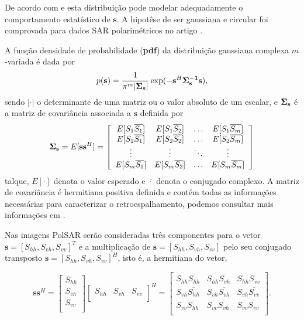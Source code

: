 De acordo com \citet{good} e \citet{lee} esta distribuição pode modelar adequadamente o comportamento estatístico de $\mathbf{s}$. A hipotêse de ser gaussiana e circular foi comprovada para dados SAR polarimétricos no artigo \citet{sarabendi}.   

A função densidade de probabilidade ({\bf pdf}) da distribuição gaussiana complexa $m$-variada é dada por
\begin{equation}\label{cap_acf_4}
    p({\bf s})=\frac{1}{\pi^m|\bf{\Sigma}_{{\bf s}}|}\exp(-{\bf s}^{H}\bf{\Sigma}_{{\bf s}}^{-1}{\bf s}), 
\end{equation}
sendo $|\cdot|$ o determinante de uma matriz ou o valor absoluto de um escalar, e $\mathbf{\Sigma}_{\bf{s}}$ é a matriz de covariância associada a $\mathbf{s}$ definida por
\begin{equation}\label{cap_acf_5}
	{\bf \Sigma_{{\bf s}}} = E[{\mathbf s}{\mathbf s}^H] = \left[
\begin{array}{cccc}
	E[S_1\overline{S_1}]  & E[{S_1}\overline{S_2}] &\hdots & E[S_1\overline{S_m}] \\
	E[S_2\overline{S_1}]  & E[{S_2}\overline{S_2}] &\hdots &E[S_2\overline{S_m}]\\
        \vdots&\vdots &\ddots &\vdots\\
	E[S_m\overline{S_1}]  & E[S_m\overline{S_2}] &\hdots &E[S_m\overline{S_m}]\\
\end{array}
\right]
\end{equation}
talque, $E[\cdot]$ denota o valor esperado e $\overline{\cdot}$ denota o conjugado complexo. A matriz de covariância é hermitiana positiva definida e contém todas as informações necessárias para caracterizar o retroespalhamento, podemos consultar mais informações em \citep{mfp}. 

Nas imagens PolSAR serão consideradas três componentes para o vetor $\mathbf{s}=[S_{hh},S_{vh},S_{vv}]^T$ e a multiplicação de $\mathbf{s}=[S_{hh},S_{vh},S_{vv}]$ pelo seu conjugado transposto $\mathbf{s}=[S_{hh},S_{vh},S_{vv}]^H$, isto é, a hermitiana do vetor, 

\begin{equation}\label{cap_acf_6}
\mathbf{s}\mathbf{s}^H = \left[
\begin{array}{c}
	S_{hh}      \\
        S_{vh}     \\
	S_{vv}      \\
\end{array}
\right]
\left[
\begin{array}{ccc}
	S_{hh}  & S_{vh}  & S_{vv}      \\
\end{array}
\right]^H = 
\left[
\begin{array}{ccc}
	S_{hh}\overline{S_{hh}} & S_{hh} \overline{S_{vh}} & S_{hh}  \overline{S_{vv}}     \\
	S_{vh} \overline{S_{hh}}  & S_{vh} \overline{S_{vh}}  & S_{vh} \overline{S_{vv}}      \\
	S_{vv} \overline{S_{hh}}  & S_{vv} \overline{S_{vh}}  & S_{vv}  \overline{S_{vv}}     \\
\end{array}
\right].
\end{equation}

